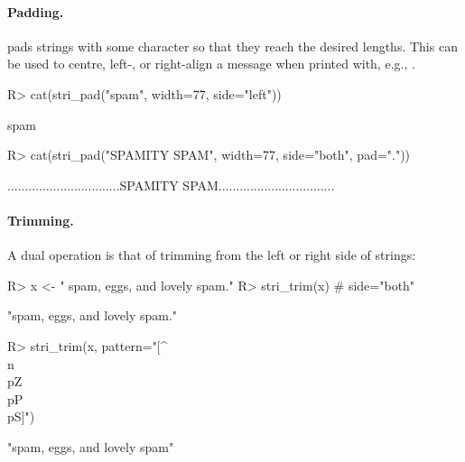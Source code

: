 \documentclass[nojss]{jss}\usepackage[]{graphicx}\usepackage[]{color}
\begin{document}
\paragraph{Padding.}
 pads strings with some character so that they
reach the desired lengths.
This can be used to centre, left-, or right-align a message
when printed with, e.g.,  .


\begin{Schunk}
\begin{Sinput}
R> cat(stri_pad("spam", width=77, side="left"))
\end{Sinput}
\begin{Soutput}
                                                                         spam
\end{Soutput}
\begin{Sinput}
R> cat(stri_pad("SPAMITY SPAM", width=77, side="both", pad="."))
\end{Sinput}
\begin{Soutput}
................................SPAMITY SPAM.................................
\end{Soutput}
\end{Schunk}







\paragraph{Trimming.}
A dual operation is that of trimming from the left or right side
of strings:

\begin{Schunk}
\begin{Sinput}
R> x <- "      spam, eggs, and lovely spam.\n"
R> stri_trim(x)  # side="both"
\end{Sinput}
\begin{Soutput}
[1] "spam, eggs, and lovely spam."
\end{Soutput}
\begin{Sinput}
R> stri_trim(x, pattern="[^\\n\\p{Z}\\p{P}\\p{S}]")
\end{Sinput}
\begin{Soutput}
[1] "spam, eggs, and lovely spam"
\end{Soutput}
\end{Schunk}
\end{document}
